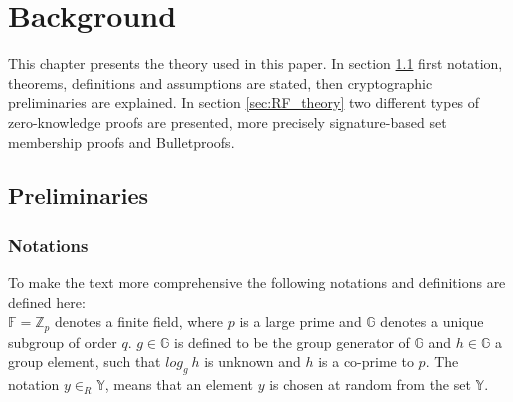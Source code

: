 \chapter{Background}
\label{ch:theory}
This chapter presents the theory used in this paper. In section \ref{sec:pereliminaries} first notation, theorems, definitions and assumptions  are stated, then cryptographic preliminaries are explained. In section \ref{sec:RF_theory} two different types of zero-knowledge proofs are presented, more precisely signature-based set membership proofs and Bulletproofs.

\section{Preliminaries}
\label{sec:pereliminaries}

\subsection*{Notations}
To make the text more comprehensive the following notations and definitions are defined here:
\\
$\mathds{F}=\mathds{Z}_p$ denotes a finite field, where $p$ is a large prime and $\mathds{G}$ denotes a unique subgroup of order $q$.  $g\in\mathds{G}$ is defined to be the group generator of $\mathds{G}$ and $h\in\mathds{G}$ a group element, such that  $log_g\:h$ is unknown and $h$ is a co-prime to $p$. 
The notation $y\in_R\mathds{Y}$, means that an element $y$ is chosen at random from the set $\mathds{Y}$.

